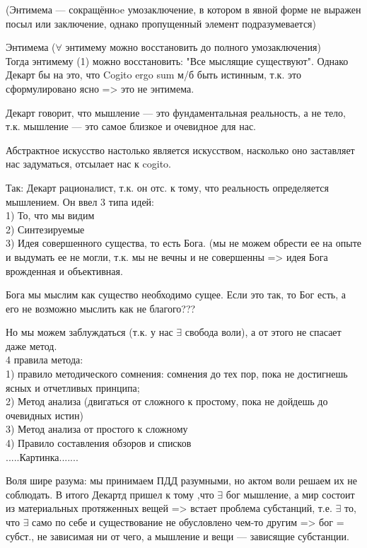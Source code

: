 \documentclass[a4paper,12pt]{article}
\begin{document}
(Энтимема --- сокращённoe умозаключение, в котором в явной форме не выражен посыл или заключение, однако пропущенный элемент подразумевается)

Энтимема ($\forall$ энтимему можно восстановить до полного умозаключения)\\
Тогда энтимему (1) можно восстановить: "Все мыслящие существуют". Однако Декарт бы на это, что Cogito ergo sum м/б быть истинным, т.к. это сформулировано ясно => это не энтимема.

Декарт говорит, что мышление --- это фундаментальная реальность, а не тело, т.к. мышление --- это самое близкое и очевидное для нас.

Абстрактное искусство настолько является искусством, насколько оно заставляет нас задуматься, отсылает нас к cogito.

Так: Декарт рационалист, т.к. он отс. к тому, что реальность определяется мышлением. Он ввел 3 типа идей:\\
1) То, что мы видим \\
2) Синтезируемые \\
3) Идея совершенного существа, то есть Бога. (мы не можем обрести ее на опыте и выдумать ее не могли, т.к. мы не вечны и не совершенны => идея Бога врожденная и объективная.

Бога мы мыслим как существо необходимо сущее. Если это так, то Бог есть, а его не возможно мыслить как не благого???

Но мы можем заблуждаться (т.к. у нас $\exists$ свобода воли), а от этого не спасает даже метод.\\
4 правила метода:\\
1) правило методического сомнения: сомнения до тех пор, пока не достигнешь ясных и отчетливых принципа;\\
2) Метод анализа (двигаться от сложного к простому, пока не дойдешь до очевидных истин) \\
3) Метод анализа от простого к сложному \\
4) Правило составления обзоров и списков\\

.....Картинка.......

Воля шире разума: мы принимаем ПДД разумными, но актом воли решаем их не соблюдать. В итого Декартд пришел к тому ,что $\exists$ бог мышление, а мир состоит из материальных протяженных вещей => встает проблема субстанций, т.е. $\exists$ то, что $\exists$ само по себе и существование не обусловлено чем-то другим => бог = субст., не зависимая ни от чего, а мышление и вещи --- зависящие субстанции.
\end{document}
